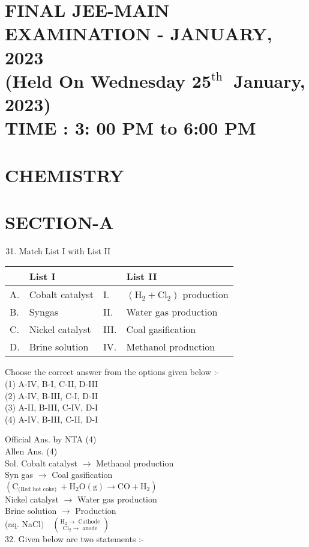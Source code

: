 \documentclass[10pt]{article}
\begin{document}
\captionsetup{singlelinecheck=false}
\section*{FINAL JEE-MAIN EXAMINATION - JANUARY, 2023 \\
 (Held On Wednesday \(\mathbf{2 5}^{\text {th }}\) January, 2023) \\
 TIME : 3: 00 PM to 6:00 PM}
\section*{CHEMISTRY}
\section*{SECTION-A}
\begin{enumerate}
  \setcounter{enumi}{30}
  \item Match List I with List II
\end{enumerate}

\begin{center}
\begin{tabular}{|l|l|l|l|}
\hline
 & List I &  & List II \\
\hline
A. & Cobalt catalyst & I. & \(\left(\mathrm{H}_{2}+\mathrm{Cl}_{2}\right)\) production \\
\hline
B. & Syngas & II. & Water gas production \\
\hline
C. & Nickel catalyst & III. & Coal gasification \\
\hline
D. & Brine solution & IV. & Methanol production \\
\hline
\end{tabular}
\end{center}

Choose the correct answer from the options given below :-\\
(1) A-IV, B-I, C-II, D-III\\
(2) A-IV, B-III, C-I, D-II\\
(3) A-II, B-III, C-IV, D-I\\
(4) A-IV, B-III, C-II, D-I

Official Ans. by NTA (4)\\
Allen Ans. (4)\\
Sol. Cobalt catalyst \(\rightarrow\) Methanol production\\
Syn gas \(\rightarrow\) Coal gasification\\
\(\left(\mathrm{C}_{\text {(Red hot coke) }}+\mathrm{H}_{2} \mathrm{O}(\mathrm{g}) \rightarrow \mathrm{CO}+\mathrm{H}_{2}\right)\)\\
Nickel catalyst \(\rightarrow\) Water gas production\\
Brine solution \(\rightarrow\) Production\\
(aq. NaCl\() \quad\binom{\mathrm{H}_{2} \rightarrow \text { Cathode }}{\mathrm{Cl}_{2} \rightarrow \text { anode }}\)\\
32. Given below are two statements :-
\end{document}
